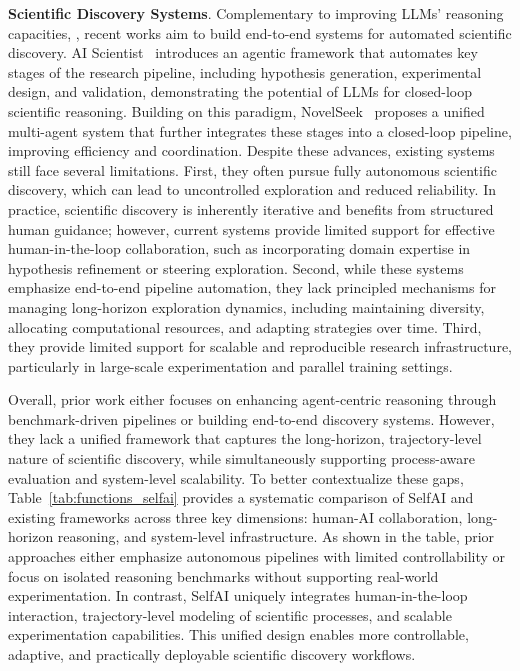 {\noindent\bf Scientific Discovery Systems}. 
Complementary to improving LLMs' reasoning capacities, , recent works aim to build end-to-end systems for automated scientific discovery. AI Scientist~\citep{lu2024ai, yamada2025ai, lu2026towards} introduces an agentic framework that automates key stages of the research pipeline, including hypothesis generation, experimental design, and validation, demonstrating the potential of LLMs for closed-loop scientific reasoning. Building on this paradigm, NovelSeek~\citep{novelseek} proposes a unified multi-agent system that further integrates these stages into a closed-loop pipeline, improving efficiency and coordination. Despite these advances, existing systems still face several limitations. First, they often pursue fully autonomous scientific discovery, which can lead to uncontrolled exploration and reduced reliability. In practice, scientific discovery is inherently iterative and benefits from structured human guidance; however, current systems provide limited support for effective human-in-the-loop collaboration, such as incorporating domain expertise in hypothesis refinement or steering exploration.
Second, while these systems emphasize end-to-end pipeline automation, they lack principled mechanisms for managing long-horizon exploration dynamics, including maintaining diversity, allocating computational resources, and adapting strategies over time. Third, they provide limited support for scalable and reproducible research infrastructure, particularly in large-scale experimentation and parallel training settings.

Overall, prior work either focuses on enhancing agent-centric reasoning through benchmark-driven pipelines or building end-to-end discovery systems. However, they lack a unified framework that captures the long-horizon, trajectory-level nature of scientific discovery, while simultaneously supporting process-aware evaluation and system-level scalability.  To better contextualize these gaps, Table~\ref{tab:functions_selfai} provides a systematic comparison of SelfAI and existing frameworks across three key dimensions: human-AI collaboration, long-horizon reasoning, and system-level infrastructure. As shown in the table, prior approaches either emphasize autonomous pipelines with limited controllability or focus on isolated reasoning benchmarks without supporting real-world experimentation. In contrast, SelfAI uniquely integrates human-in-the-loop interaction, trajectory-level modeling of scientific processes, and scalable experimentation capabilities. This unified design enables more controllable, adaptive, and practically deployable scientific discovery workflows.

